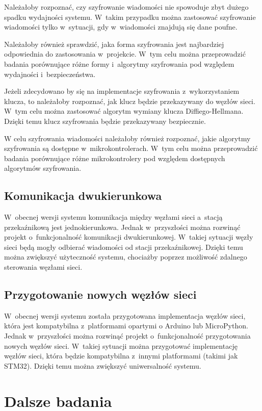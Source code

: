 Należałoby rozpoznać, czy szyfrowanie wiadomości nie spowoduje zbyt dużego spadku wydajności systemu.
W~takim przypadku można zastosować szyfrowanie wiadomości tylko w~sytuacji, gdy w~wiadomości znajdują się dane poufne.

Należałoby również sprawdzić, jaka forma szyfrowania jest najbardziej odpowiednia do zastosowania w~projekcie.
W~tym celu można przeprowadzić badania porównujące różne formy i~algorytmy szyfrowania pod względem wydajności i~bezpieczeństwa.

Jeżeli zdecydowano by się na implementacje szyfrowania z~wykorzystaniem klucza, to należałoby rozpoznać, jak klucz będzie przekazywany do węzłów sieci.
W~tym celu można zastosować algorytm wymiany klucza Diffiego-Hellmana.
Dzięki temu klucz szyfrowania będzie przekazywany bezpiecznie.

W celu szyfrowania wiadomości należałoby również rozpoznać, jakie algorytmy szyfrowania są dostępne w~mikrokontrolerach.
W~tym celu można przeprowadzić badania porównujące różne mikrokontrolery pod względem dostępnych algorytmów szyfrowania.

\subsection{Komunikacja dwukierunkowa}
W~obecnej wersji systemu komunikacja między węzłami sieci a~stacją przekaźnikową jest jednokierunkowa.
Jednak w~przyszłości można rozwinąć projekt o~funkcjonalność komunikacji dwukierunkowej.
W~takiej sytuacji węzły sieci będą mogły odbierać wiadomości od stacji przekaźnikowej.
Dzięki temu można zwiększyć użyteczność systemu, chociażby poprzez możliwość zdalnego sterowania węzłami sieci.

\subsection{Przygotowanie nowych węzłów sieci}
W~obecnej wersji systemu została przygotowana implementacja węzłów sieci, która jest kompatybilna z~platformami opartymi o Arduino lub MicroPython.
Jednak w~przyszłości można rozwinąć projekt o~funkcjonalność przygotowania nowych węzłów sieci.
W~takiej sytuacji można przygotować implementację węzłów sieci, która będzie kompatybilna z~innymi platformami (takimi jak STM32).
Dzięki temu można zwiększyć uniwersalność systemu.

\section{Dalsze badania}

